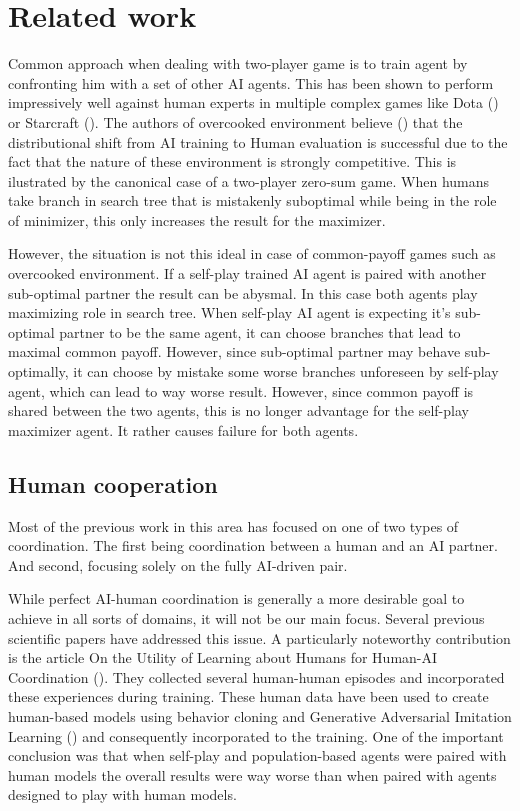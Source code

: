 \chapter{Related work}

Common approach when dealing with two-player game is to train agent by confronting him with a set of other AI agents.
This has been shown to perform impressively well against human experts in multiple complex games like Dota (\cite{DotaOpenFive}) or Starcraft (\cite{Starcraft}).
The authors of overcooked environment believe (\cite{carroll2020utility}) that the distributional shift from AI training to Human evaluation is successful due to the fact that the nature of these environment is strongly competitive.
This is ilustrated by the canonical case of a two-player zero-sum game.
When humans take branch in search tree that is mistakenly suboptimal while being in the role of minimizer, this only increases the result for the maximizer.

However, the situation is not this ideal in case of common-payoff games such as overcooked environment.
If a self-play trained AI agent is paired with another sub-optimal partner the result can be abysmal. 
In this case both agents play maximizing role in search tree. 
When self-play AI agent is expecting it's sub-optimal partner to be the same agent, it can choose branches that lead to maximal common payoff.
However, since sub-optimal partner may behave sub-optimally, it can choose by mistake some worse branches unforeseen by self-play agent, which can lead to way worse result.
However, since common payoff is shared between the two agents, this is no longer advantage for the self-play maximizer agent.
It rather causes failure for both agents.

\section{Human cooperation}
Most of the previous work in this area has focused on one of two types of coordination. 
The first being coordination between a human and an AI partner. 
And second, focusing solely on the fully AI-driven pair.


\par

While perfect AI-human coordination is generally a more desirable goal to achieve in all sorts of domains, it will not be our main focus.  
Several previous scientific papers have addressed this issue. A particularly noteworthy contribution is the article 
On the Utility of Learning about Humans for Human-AI Coordination (\cite{carroll2020utility}). 
They collected several human-human episodes and incorporated these experiences during training.
These human data have been used to create human-based models using behavior cloning and Generative Adversarial Imitation Learning (\cite{Ho2016GenerativeAI}) and consequently incorporated to the training.
One of the important conclusion was that when self-play and population-based agents were paired with human models the overall results were way worse than when paired with agents designed to play with human models.


